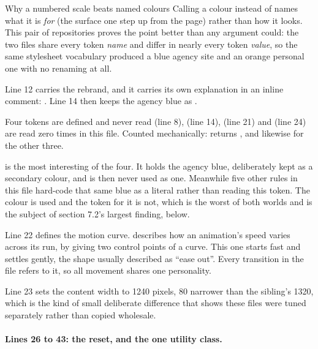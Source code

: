 \begin{keyidea}{Why a numbered scale beats named colours}
Calling a colour  instead of  names what it is
\emph{for} (the surface one step up from the page) rather than how it looks. This
pair of repositories proves the point better than any argument could: the two files
share every token \emph{name} and differ in nearly every token \emph{value}, so the
same stylesheet vocabulary produced a blue agency site and an orange personal one
with no renaming at all.
\end{keyidea}

Line 12 carries the rebrand, and it carries its own explanation in an inline
comment: . Line 14 then
keeps the agency blue as .

\begin{honest}{Four tokens are defined and never read}
 (line 8),  (line 14),  (line 21) and
 (line 24) are read zero times in this file. Counted mechanically:
 returns , and likewise for the other three.

 is the most interesting of the four. It holds the agency blue,
deliberately kept as a secondary colour, and is then never used as one. Meanwhile
five other rules in this file hard-code that same blue as a literal rather than
reading this token. The colour is used and the token for it is not, which is the
worst of both worlds and is the subject of section 7.2's largest finding, below.
\end{honest}

Line 22 defines the motion curve.  describes how an
animation's speed varies across its run, by giving two control points of a curve.
This one starts fast and settles gently, the shape usually described as ``ease
out''. Every transition in the file refers to it, so all movement shares one
personality.

Line 23 sets the content width to 1240 pixels, 80 narrower than the sibling's 1320,
which is the kind of small deliberate difference that shows these files were tuned
separately rather than copied wholesale.

\paragraph{Lines 26 to 43: the reset, and the one utility class.}

